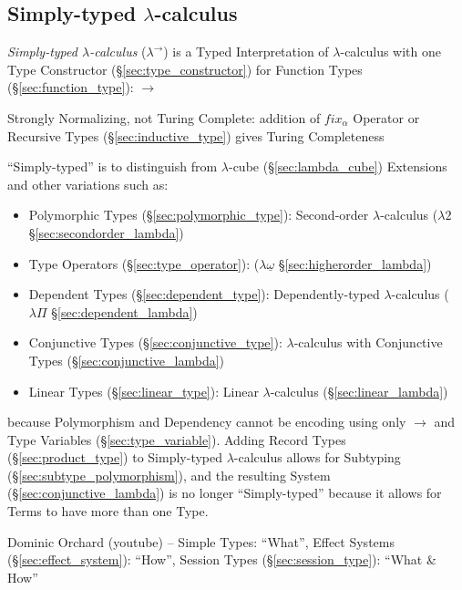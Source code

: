 \subsection{Simply-typed $\lambda$-calculus}\label{sec:simply_typed}

\emph{Simply-typed $\lambda$-calculus} ($\lambda^\rightarrow$) is a Typed
Interpretation of $\lambda$-calculus with one Type Constructor
(\S\ref{sec:type_constructor}) for Function Types (\S\ref{sec:function_type}):
$\rightarrow$

Strongly Normalizing, not Turing Complete: addition of $fix_\alpha$ Operator or
Recursive Types (\S\ref{sec:inductive_type}) gives Turing Completeness

``Simply-typed'' is to distinguish from $\lambda$-cube (\S\ref{sec:lambda_cube})
Extensions and other variations such as:
\begin{itemize}
  \item Polymorphic Types (\S\ref{sec:polymorphic_type}): Second-order
    $\lambda$-calculus ($\lambda2$ \S\ref{sec:secondorder_lambda})
  \item Type Operators (\S\ref{sec:type_operator}):
    ($\lambda\underline{\omega}$ \S\ref{sec:higherorder_lambda})
  \item Dependent Types (\S\ref{sec:dependent_type}):
    Dependently-typed $\lambda$-calculus ($\lambda\Pi$
    \S\ref{sec:dependent_lambda})
  \item Conjunctive Types (\S\ref{sec:conjunctive_type}):
    $\lambda$-calculus with Conjunctive Types
    (\S\ref{sec:conjunctive_lambda})
  \item Linear Types (\S\ref{sec:linear_type}): Linear
    $\lambda$-calculus (\S\ref{sec:linear_lambda})
\end{itemize}
because Polymorphism and Dependency cannot be encoding using only
$\rightarrow$ and Type Variables (\S\ref{sec:type_variable}). Adding
Record Types (\S\ref{sec:product_type}) to Simply-typed
$\lambda$-calculus allows for Subtyping
(\S\ref{sec:subtype_polymorphism}), and the resulting System
(\S\ref{sec:conjunctive_lambda}) is no longer ``Simply-typed'' because
it allows for Terms to have more than one Type.

Dominic Orchard (youtube) -- Simple Types: ``What'', Effect Systems
(\S\ref{sec:effect_system}): ``How'', Session Types
(\S\ref{sec:session_type}): ``What \& How''

